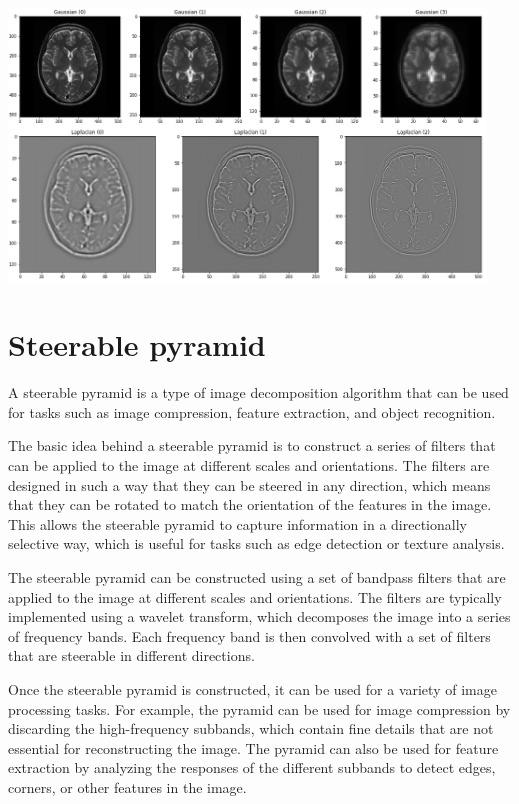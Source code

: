 \documentclass{article}
\begin{document}
\begin{center}
    \includegraphics[width=0.95\textwidth]{images/pyr_example.png}
\end{center}

\newpage

\section*{Steerable pyramid}

A steerable pyramid is a type of image decomposition algorithm that can be used for tasks such as image compression, feature extraction, and object recognition.

The basic idea behind a steerable pyramid is to construct a series of filters that can be applied to the image at different scales and orientations. The filters are designed in such a way that they can be steered in any direction, which means that they can be rotated to match the orientation of the features in the image. This allows the steerable pyramid to capture information in a directionally selective way, which is useful for tasks such as edge detection or texture analysis.

The steerable pyramid can be constructed using a set of bandpass filters that are applied to the image at different scales and orientations. The filters are typically implemented using a wavelet transform, which decomposes the image into a series of frequency bands. Each frequency band is then convolved with a set of filters that are steerable in different directions.

Once the steerable pyramid is constructed, it can be used for a variety of image processing tasks. For example, the pyramid can be used for image compression by discarding the high-frequency subbands, which contain fine details that are not essential for reconstructing the image. The pyramid can also be used for feature extraction by analyzing the responses of the different subbands to detect edges, corners, or other features in the image.
\end{document}

